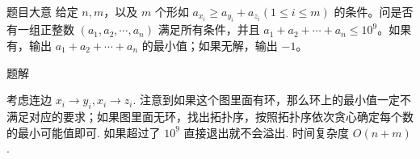 \begin{frame}{题目大意}
	给定 $n,m$，以及 $m$ 个形如 $a_{x_i}\ge a_{y_i}+a_{z_i}(1 \le i \le m)$ 的条件。问是否有一组正整数 $(a_1,a_2,\cdots,a_n)$ 满足所有条件，并且 $a_1+a_2+\cdots+a_n \le 10^{9}$。如果有，输出 $a_1+a_2+\cdots+a_n$ 的最小值；如果无解，输出 $-1$。
\end{frame}

\begin{frame}{题解}

考虑连边 $x_i\to y_i,x_i \to z_i$. 注意到如果这个图里面有环，那么环上的最小值一定不满足对应的要求；如果图里面无环，找出拓扑序，按照拓扑序依次贪心确定每个数的最小可能值即可. 如果超过了 $10^9$ 直接退出就不会溢出. 时间复杂度 $O(n+m)$. 
	
\end{frame}
